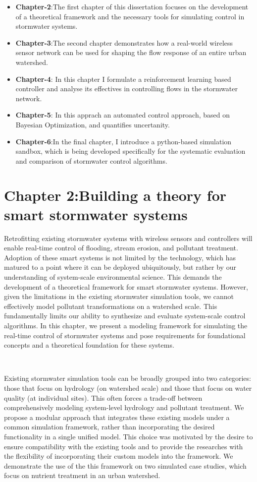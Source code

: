 \begin{itemize}
	\item \textbf{Chapter-2}:The first chapter of this dissertation focuses on the development of a theoretical framework and the necessary tools for simulating control in stormwater systems.	
	\item \textbf{Chapter-3}:The second chapter demonstrates how a real-world wireless sensor network can be used for shaping the flow response of an entire urban watershed. 
	\item \textbf{Chapter-4}: In this chapter I formulate a reinforcement learning based controller and analyse its effectives in controlling flows in the stormwater network.
	\item \textbf{Chapter-5}: In this apprach an automated control approach, based on Bayesian Optimization, and quantifies uncertanity. 
	\item \textbf{Chapter-6}:In the final chapter, I introduce a python-based simulation sandbox, which is being developed specifically for the systematic evaluation and comparison of stormwater control algorithms.
\end{itemize}
 

\section{Chapter 2:Building a theory for smart stormwater systems}

Retrofitting existing stormwater systems with wireless sensors and controllers will enable real-time control of flooding, stream erosion, and pollutant treatment. 
Adoption of these smart systems is not limited by the technology, which has matured to a point where it can be deployed ubiquitously, but rather by our understanding of system-scale environmental science.
This demands the development of a theoretical framework for smart stormwater systems.
However, given the limitations in the existing stormwater simulation tools, we cannot effectively model pollutant transformations on a watershed scale.
This fundamentally limits our ability to synthesize and evaluate system-scale control algorithms. 
In this chapter, we present a modeling framework for simulating the real-time control of stormwater systems and pose requirements for foundational concepts and a theoretical foundation for these systems. 

\

Existing stormwater simulation tools can be broadly grouped into two categories: those that focus on hydrology (on watershed scale) and those that focus on water quality (at individual sites).
This often forces a trade-off between comprehensively modeling system-level hydrology and pollutant treatment.
We propose a modular approach that integrates these existing models under a common simulation framework, rather than incorporating the desired functionality in a single unified model.
This choice was motivated by the desire to ensure compatibility with the existing tools and to provide the researches with the flexibility of incorporating their custom models into the framework.
We demonstrate the use of the this framework on two simulated case studies, which focus on nutrient treatment in an urban watershed.

